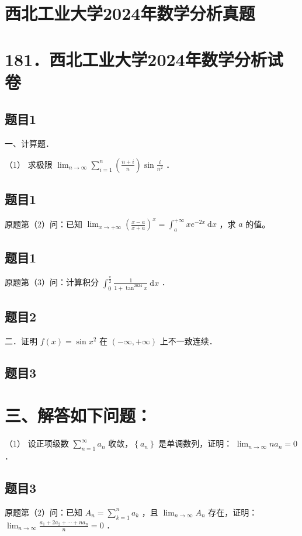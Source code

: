 \documentclass{article}
\begin{document}
\section*{西北工业大学2024年数学分析真题}
\section*{181．西北工业大学2024年数学分析试卷}

\subsection{题目1}
一、计算题．

（1） 求极限 \(\lim _{n \rightarrow \infty} \sum_{i=1}^{n}\left(\frac{n+i}{n}\right) \sin \frac{i}{n^{2}}\) ．

\subsection{题目1}
原题第（2）问：已知 \(\lim _{x \rightarrow+\infty}\left(\frac{x-a}{x+a}\right)^{x}=\int_{a}^{+\infty} x e^{-2 x} \mathrm{~d} x\) ，求 \(a\) 的值。

\subsection{题目1}
原题第（3）问：计算积分 \(\int_{0}^{\frac{\pi}{2}} \frac{1}{1+\tan ^{2024} x} \mathrm{~d} x\) ．

\subsection{题目2}
二．证明 \(f(x)=\sin x^{2}\) 在 \((-\infty,+\infty)\) 上不一致连续．

\subsection{题目3}
\section*{三、解答如下问题：}

（1） 设正项级数 \(\sum_{n=1}^{\infty} a_{n}\) 收敛，\(\left\{a_{n}\right\}\) 是单调数列，证明： \(\lim _{n \rightarrow \infty} n a_{n}=0\) ．

\subsection{题目3}
原题第（2）问：已知 \(A_{n}=\sum_{k=1}^{n} a_{k}\) ，且 \(\lim _{n \rightarrow \infty} A_{n}\) 存在，证明： \(\lim _{n \rightarrow \infty} \frac{a_{1}+2 a_{2}+\cdots+n a_{n}}{n}=0\) ．
\end{document}

